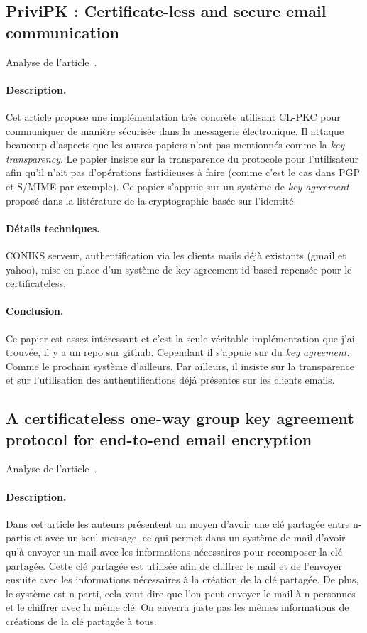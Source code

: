 \subsection{PriviPK : Certificate-less and secure email communication}
Analyse de l'article~\cite{DBLP:journals/compsec/AlSabahTLSD17}.
\paragraph*{Description.} Cet article propose une implémentation très concrète utilisant CL-PKC pour communiquer de manière sécurisée dans la messagerie électronique. Il attaque beaucoup d'aspects que les autres papiers n'ont pas mentionnés comme la \textit{key transparency}. Le papier insiste sur la transparence du protocole pour l'utilisateur afin qu'il n'ait pas d'opérations fastidieuses à faire (comme c'est le cas dans PGP et S/MIME par exemple). Ce papier s'appuie sur un système de \textit{key agreement} proposé dans la littérature de la cryptographie basée sur l'identité.
\paragraph*{Détails techniques.} CONIKS serveur, authentification via les clients mails déjà existants (gmail et yahoo), mise en place d'un système de key agreement id-based repensée pour le certificateless.
\paragraph*{Conclusion.} Ce papier est assez intéressant et c'est la seule véritable implémentation que j'ai trouvée, il y a un repo sur github. Cependant il s'appuie sur du \textit{key agreement}. Comme le prochain système d'ailleurs. Par ailleurs, il insiste sur la transparence et sur l'utilisation des authentifications déjà présentes sur les clients emails.
\subsection{A certificateless one-way group key agreement protocol for end-to-end email encryption}
Analyse de l'article~\cite{DBLP:conf/prdc/YehSDSSW18}.
\paragraph*{Description.} Dans cet article les auteurs présentent un moyen d'avoir une clé partagée entre n-partis et avec un seul message, ce qui permet dans un système de mail d'avoir qu'à envoyer un mail avec les informations nécessaires pour recomposer la clé partagée. Cette clé partagée est utilisée afin de chiffrer le mail et de l'envoyer ensuite avec les informations nécessaires à la création de la clé partagée. De plus, le système est n-parti, cela veut dire que l'on peut envoyer le mail à n personnes et le chiffrer avec la même clé. On enverra juste pas les mêmes informations de créations de la clé partagée à tous.
